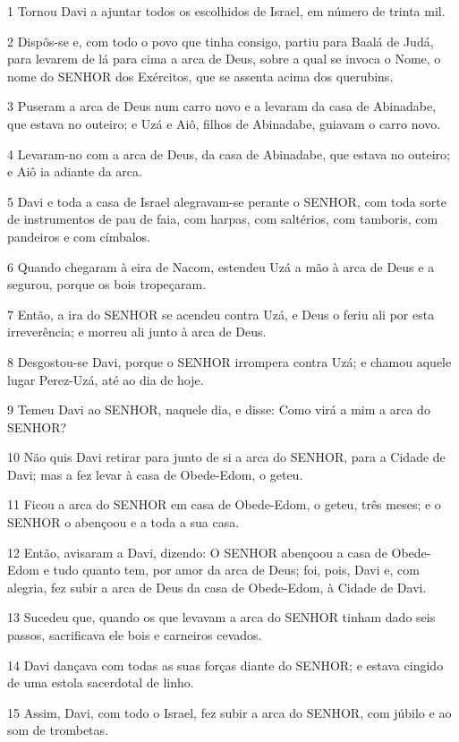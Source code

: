 \par 1 Tornou Davi a ajuntar todos os escolhidos de Israel, em número de trinta mil.
\par 2 Dispôs-se e, com todo o povo que tinha consigo, partiu para Baalá de Judá, para levarem de lá para cima a arca de Deus, sobre a qual se invoca o Nome, o nome do SENHOR dos Exércitos, que se assenta acima dos querubins.
\par 3 Puseram a arca de Deus num carro novo e a levaram da casa de Abinadabe, que estava no outeiro; e Uzá e Aiô, filhos de Abinadabe, guiavam o carro novo.
\par 4 Levaram-no com a arca de Deus, da casa de Abinadabe, que estava no outeiro; e Aiô ia adiante da arca.
\par 5 Davi e toda a casa de Israel alegravam-se perante o SENHOR, com toda sorte de instrumentos de pau de faia, com harpas, com saltérios, com tamboris, com pandeiros e com címbalos.
\par 6 Quando chegaram à eira de Nacom, estendeu Uzá a mão à arca de Deus e a segurou, porque os bois tropeçaram.
\par 7 Então, a ira do SENHOR se acendeu contra Uzá, e Deus o feriu ali por esta irreverência; e morreu ali junto à arca de Deus.
\par 8 Desgostou-se Davi, porque o SENHOR irrompera contra Uzá; e chamou aquele lugar Perez-Uzá, até ao dia de hoje.
\par 9 Temeu Davi ao SENHOR, naquele dia, e disse: Como virá a mim a arca do SENHOR?
\par 10 Não quis Davi retirar para junto de si a arca do SENHOR, para a Cidade de Davi; mas a fez levar à casa de Obede-Edom, o geteu.
\par 11 Ficou a arca do SENHOR em casa de Obede-Edom, o geteu, três meses; e o SENHOR o abençoou e a toda a sua casa.
\par 12 Então, avisaram a Davi, dizendo: O SENHOR abençoou a casa de Obede-Edom e tudo quanto tem, por amor da arca de Deus; foi, pois, Davi e, com alegria, fez subir a arca de Deus da casa de Obede-Edom, à Cidade de Davi.
\par 13 Sucedeu que, quando os que levavam a arca do SENHOR tinham dado seis passos, sacrificava ele bois e carneiros cevados.
\par 14 Davi dançava com todas as suas forças diante do SENHOR; e estava cingido de uma estola sacerdotal de linho.
\par 15 Assim, Davi, com todo o Israel, fez subir a arca do SENHOR, com júbilo e ao som de trombetas.

